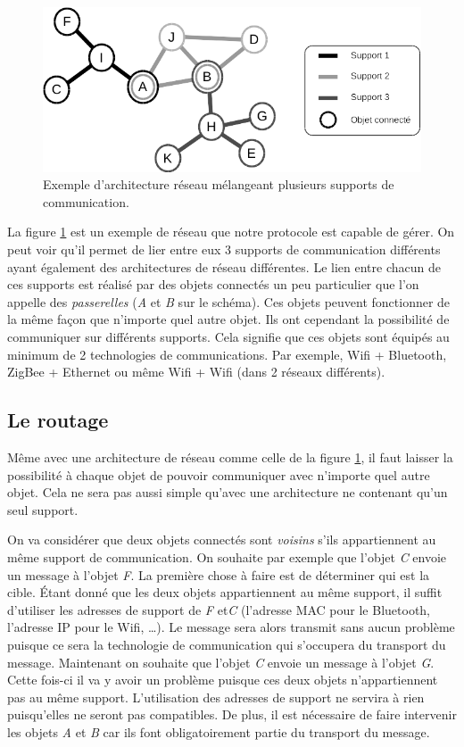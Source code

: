       \begin{figure}[!ht]
         \centering
         \includegraphics[width=.8\textwidth]{img/multinet.png}
         \caption{Exemple d'architecture réseau mélangeant plusieurs supports de communication.}
         \label{multinet}
      \end{figure}
      
      La figure \ref{multinet} est un exemple de réseau que notre protocole est capable de gérer. 
      On peut voir qu'il permet de lier entre eux 3 supports de communication différents ayant 
		également des architectures de réseau différentes. Le lien entre chacun de ces supports est 
		réalisé par des objets connectés un peu particulier que l'on appelle des \emph{passerelles} 
		(\emph{A} et \emph{B} sur le schéma).
		Ces objets peuvent fonctionner de la même façon que n'importe quel autre objet. Ils ont cependant la possibilité de communiquer sur différents supports. Cela signifie que ces objets sont équipés au minimum de 2 technologies de communications. Par exemple, Wifi + Bluetooth,
		ZigBee + Ethernet ou même Wifi + Wifi (dans 2 réseaux différents).
		
	\subsection{Le routage}
		Même avec une architecture de réseau comme celle de la figure \ref{multinet}, il faut laisser la possibilité à chaque objet de pouvoir communiquer avec n'importe quel autre objet. Cela ne sera pas aussi simple qu'avec une architecture ne contenant qu'un seul support.
		
		On va considérer que deux objets connectés sont \emph{voisins} s'ils appartiennent au même	support de communication. On souhaite par exemple que l'objet \emph{C} envoie un message à l'objet \emph{F}. La première chose à faire est de déterminer qui est la cible. Étant donné que les deux objets appartiennent au même support, il suffit d'utiliser les adresses de support de \emph{F} et\emph{C} (l'adresse MAC pour le Bluetooth, l'adresse IP pour le Wifi, \dots). Le message sera alors		transmit sans aucun problème puisque ce sera la technologie de communication qui s'occupera 	du transport du message. Maintenant on souhaite que l'objet \emph{C} envoie un message à 
		l'objet \emph{G}. Cette fois-ci il va y avoir un problème puisque ces deux objets
		n'appartiennent pas au même support. L'utilisation des adresses de support ne servira à rien
		puisqu'elles ne seront pas compatibles. De plus, il est nécessaire de faire intervenir les
		objets \emph{A} et \emph{B} car ils font obligatoirement partie du transport du message.
		
